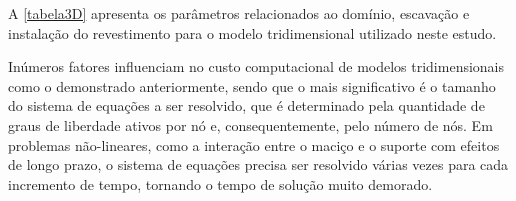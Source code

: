 A \autoref{tabela3D} apresenta os parâmetros relacionados ao domínio, escavação e instalação do revestimento para o modelo tridimensional utilizado neste estudo.

Inúmeros fatores influenciam no custo computacional de modelos tridimensionais como o demonstrado anteriormente, sendo que o mais significativo é o tamanho do sistema de equações a ser resolvido, que é determinado pela quantidade de graus de liberdade ativos por nó e, consequentemente, pelo número de nós. Em problemas não-lineares, como a interação entre o maciço e o suporte com efeitos de longo prazo, o sistema de equações precisa ser resolvido várias vezes para cada incremento de tempo, tornando o tempo de solução muito demorado.%

